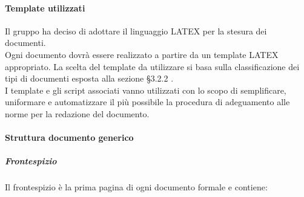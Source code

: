 			\paragraph{Template utilizzati }
				Il gruppo ha deciso di adottare il linguaggio LATEX per la stesura dei documenti. \\
				Ogni documento dovrà essere realizzato a partire da un template LATEX appropriato. La scelta del template da utilizzare si basa sulla classificazione dei tipi di documenti esposta alla sezione §3.2.2 .\\
				I template e gli script associati vanno utilizzati con lo scopo di semplificare, uniformare e automatizzare il più possibile la procedura di adeguamento alle norme per la redazione del documento.\\
			\paragraph{Struttura documento generico}
				\subparagraph{Frontespizio}
					Il frontespizio è la prima pagina di ogni documento formale e contiene: \\
